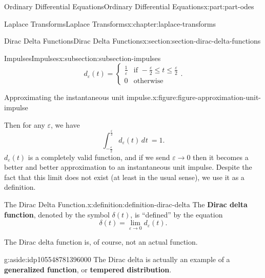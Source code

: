 \documentclass[oneside,10pt,]{book}
\newcommand{\terminology}[1]{\textbf{#1}}
\numberwithin{equation}{part}
\newcommand{\dd}[2][]{\, d^{#1} #2\ }
\newcommand{\Int}[2]{\int_{#1}^{#2}}
\newcommand{\limit}[2]{\lim_{#1\to#2}}
\newcommand{\amp}{&}
\begin{document}
\begin{partptx}{Ordinary Differential Equations}{}{Ordinary Differential Equations}{}{}{x:part:part-odes}
\begin{chapterptx}{Laplace Transforms}{}{Laplace Transforms}{}{}{x:chapter:laplace-transforms}
\begin{sectionptx}{Dirac Delta Functions}{}{Dirac Delta Functions}{}{}{x:section:section-dirac-delta-functions}
\begin{subsectionptx}{Impulses}{}{Impulses}{}{}{x:subsection:subsection-impulses}
\begin{equation*}
d_{\varepsilon}(t) = 
\begin{cases}
\frac{1}{\varepsilon} \amp\text{if }-\frac{\varepsilon}{2}\leq t\leq \frac{\varepsilon}{2} \\
0 \amp\text{otherwise}  
\end{cases}.
\end{equation*}
\begin{figureptx}{Approximating the instantaneous unit impulse.}{x:figure:figure-approximation-unit-impulse}{}%
\begin{image}{0}{1}{0}%
%
\end{image}%
\tcblower
\end{figureptx}%
%
\par
Then for any \(\varepsilon\), we have%
\begin{equation*}
\Int{-\frac{\varepsilon}{2}}{\frac{\varepsilon}{2}}d_{\varepsilon}(t)\dd{t} = 1.
\end{equation*}
\(d_{\varepsilon}(t)\) is a completely valid function, and if we send \(\varepsilon\to0\) then it becomes a better and better approximation to an instantaneous unit impulse. Despite the fact that this limit does not exist (at least in the usual sense), we use it as a definition.%
\begin{definition}{The Dirac Delta Function.}{x:definition:definition-dirac-delta}%
The \terminology{Dirac delta function}, denoted by the symbol \(\delta(t)\), is ``defined'' by the equation%
\begin{equation*}
\delta(t) = \limit{\varepsilon}{0}d_{\varepsilon}(t).
\end{equation*}
%
\end{definition}
The Dirac delta function is, of course, not an actual function. \begin{aside}{}{g:aside:idp105548781396000}%
The Dirac delta is actually an example of a \terminology{generalized function}, or \terminology{tempered distribution}.%
\end{aside}

\end{subsectionptx}
\end{sectionptx}
\end{chapterptx}
\end{partptx}
\end{document}
